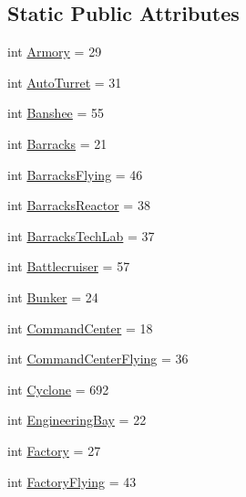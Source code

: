 \subsection*{Static Public Attributes}
\begin{DoxyCompactItemize}
\item 
int \mbox{\hyperlink{classpysc2_1_1lib_1_1units_1_1_terran_aee04002a98d46a17aeb4b46e5996cd74}{Armory}} = 29
\item 
int \mbox{\hyperlink{classpysc2_1_1lib_1_1units_1_1_terran_ab55b3ff4f1410217e3e9344dbcca9e7b}{Auto\+Turret}} = 31
\item 
int \mbox{\hyperlink{classpysc2_1_1lib_1_1units_1_1_terran_ab3ca87cc6f5fa92279fa124b4057eece}{Banshee}} = 55
\item 
int \mbox{\hyperlink{classpysc2_1_1lib_1_1units_1_1_terran_af2239d867dadc8a7d213070b101f6b2c}{Barracks}} = 21
\item 
int \mbox{\hyperlink{classpysc2_1_1lib_1_1units_1_1_terran_ad9d27fdaf1d51dafd2a3403abf07673d}{Barracks\+Flying}} = 46
\item 
int \mbox{\hyperlink{classpysc2_1_1lib_1_1units_1_1_terran_a8400365cd6d0de5c5c4fa058c6565153}{Barracks\+Reactor}} = 38
\item 
int \mbox{\hyperlink{classpysc2_1_1lib_1_1units_1_1_terran_a78b8c93320a737b2ec9a0503fcdb8c44}{Barracks\+Tech\+Lab}} = 37
\item 
int \mbox{\hyperlink{classpysc2_1_1lib_1_1units_1_1_terran_a5b50b1fd25ae20fd08928b97358406d9}{Battlecruiser}} = 57
\item 
int \mbox{\hyperlink{classpysc2_1_1lib_1_1units_1_1_terran_a813da9f96ace3a051e73101610de3c2b}{Bunker}} = 24
\item 
int \mbox{\hyperlink{classpysc2_1_1lib_1_1units_1_1_terran_a0d9dd8b65858ed7118f5043eb3d961dd}{Command\+Center}} = 18
\item 
int \mbox{\hyperlink{classpysc2_1_1lib_1_1units_1_1_terran_a937fc57706ce3eb20fda81b63210cb58}{Command\+Center\+Flying}} = 36
\item 
int \mbox{\hyperlink{classpysc2_1_1lib_1_1units_1_1_terran_a92ce3557fa52a9eb2928ff4f0cd4fa54}{Cyclone}} = 692
\item 
int \mbox{\hyperlink{classpysc2_1_1lib_1_1units_1_1_terran_a86c01475b1f47718e438d63a610c2c81}{Engineering\+Bay}} = 22
\item 
int \mbox{\hyperlink{classpysc2_1_1lib_1_1units_1_1_terran_a197f985d1e29b4b953f7e92d4b489227}{Factory}} = 27
\item 
int \mbox{\hyperlink{classpysc2_1_1lib_1_1units_1_1_terran_abf6097fc43bcee283f422a10509de1aa}{Factory\+Flying}} = 43

\end{DoxyCompactItemize}
